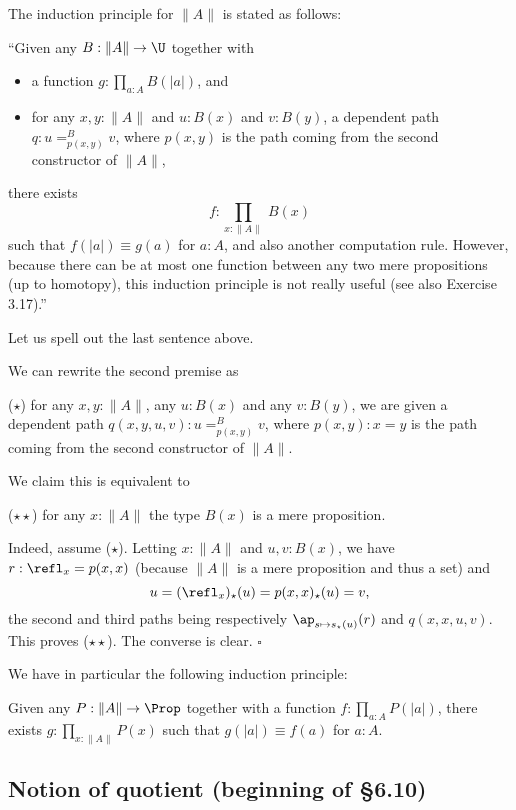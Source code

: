 \documentclass[12pt]{article}
\begin{document}
The induction principle for $\lVert A\rVert$ is stated as follows:

\nn``Given any $B:\lVert A\rVert\to\U$ together with
\begin{itemize}
\item a function $g:\prod_{a:A}B(\lvert a\rvert)$, and
\item for any $x,y:\lVert A\rVert$ and $u:B(x)$ and $v:B(y)$, a dependent path $q:u=^B_{p(x,y)}v$, where $p(x,y)$ is the path coming from the second constructor of $\lVert A\rVert$,
\end{itemize}
there exists 
$$
f:\prod_{x:\lVert A\rVert}\ B(x)
$$ 
such that $f(\lvert a\rvert)\equiv g(a)$ for $a:A$, and also another computation rule. However, because there can be at most one function between any two mere propositions (up to homotopy), this induction principle is not really useful (see also Exercise 3.17).''

Let us spell out the last sentence above.

We can rewrite the second premise as

\nn($\star$) for any $x,y:\lVert A\rVert$, any $u:B(x)$ and any $v:B(y)$, we are given a dependent path $q(x,y,u,v):u=^B_{p(x,y)}v$, where $p(x,y):x=y$ is the path coming from the second constructor of $\lVert A\rVert$.

We claim this is equivalent to

\nn($\star\star$) for any $x:\lVert A\rVert$ the type $B(x)$ is a mere proposition.

Indeed, assume ($\star$). Letting $x:\lVert A\rVert$ and $u,v:B(x)$, we have $r:\refl_x=p(x,x)$ (because $\lVert A\rVert$ is a mere proposition and thus a set) and 
$$
u=(\refl_x)_\star(u)=p(x,x)_\star(u)=v,
$$ 
the second and third paths being respectively $\ap_{s\mapsto s_\star(u)}(r)$ and $q(x,x,u,v)$. This proves ($\star\star$). The converse is clear. $\square$

We have in particular the following induction principle:

Given any $P:\lVert A\rVert\to\Prop$ together with a function $f:\prod_{a:A}P(\lvert a\rvert)$, there exists $g:\prod_{x:\lVert A\rVert}P(x)$ such that $g(\lvert a\rvert)\equiv f(a)$ for $a:A$.


\subsection{Notion of quotient (beginning of \S6.10)}\label{610}
\end{document}
